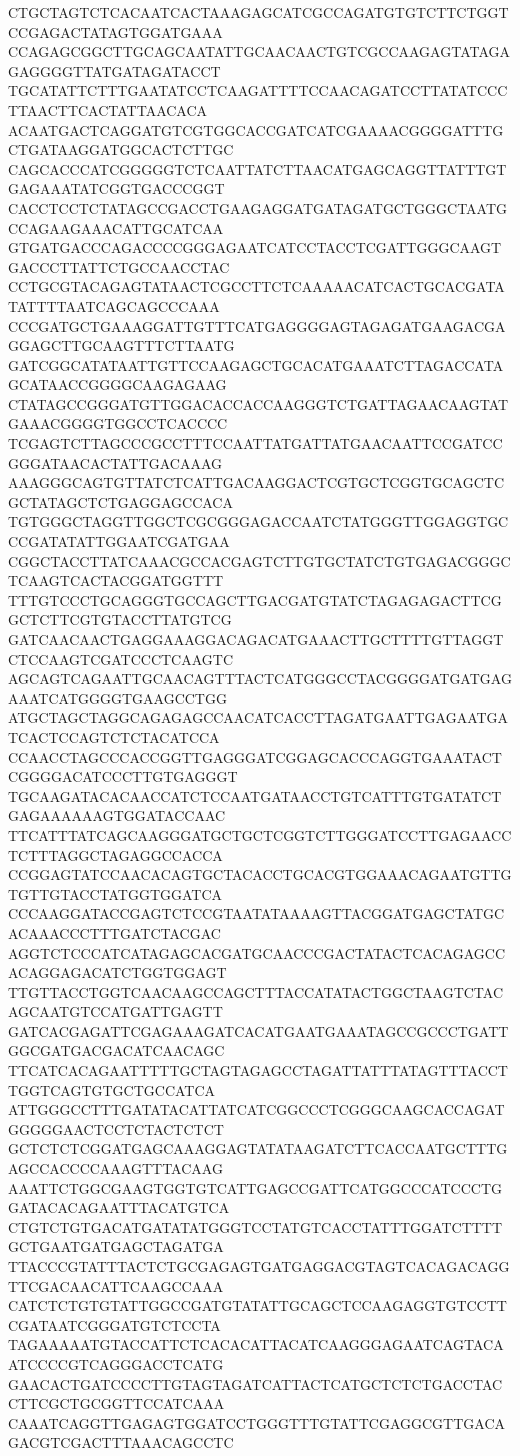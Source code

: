 CTGCTAGTCTCACAATCACTAAAGAGCATCGCCAGATGTGTCTTCTGGTCCGAGACTATAGTGGATGAAA
CCAGAGCGGCTTGCAGCAATATTGCAACAACTGTCGCCAAGAGTATAGAGAGGGGTTATGATAGATACCT
TGCATATTCTTTGAATATCCTCAAGATTTTCCAACAGATCCTTATATCCCTTAACTTCACTATTAACACA
ACAATGACTCAGGATGTCGTGGCACCGATCATCGAAAACGGGGATTTGCTGATAAGGATGGCACTCTTGC
CAGCACCCATCGGGGGTCTCAATTATCTTAACATGAGCAGGTTATTTGTGAGAAATATCGGTGACCCGGT
CACCTCCTCTATAGCCGACCTGAAGAGGATGATAGATGCTGGGCTAATGCCAGAAGAAACATTGCATCAA
GTGATGACCCAGACCCCGGGAGAATCATCCTACCTCGATTGGGCAAGTGACCCTTATTCTGCCAACCTAC
CCTGCGTACAGAGTATAACTCGCCTTCTCAAAAACATCACTGCACGATATATTTTAATCAGCAGCCCAAA
CCCGATGCTGAAAGGATTGTTTCATGAGGGGAGTAGAGATGAAGACGAGGAGCTTGCAAGTTTCTTAATG
GATCGGCATATAATTGTTCCAAGAGCTGCACATGAAATCTTAGACCATAGCATAACCGGGGCAAGAGAAG
CTATAGCCGGGATGTTGGACACCACCAAGGGTCTGATTAGAACAAGTATGAAACGGGGTGGCCTCACCCC
TCGAGTCTTAGCCCGCCTTTCCAATTATGATTATGAACAATTCCGATCCGGGATAACACTATTGACAAAG
AAAGGGCAGTGTTATCTCATTGACAAGGACTCGTGCTCGGTGCAGCTCGCTATAGCTCTGAGGAGCCACA
TGTGGGCTAGGTTGGCTCGCGGGAGACCAATCTATGGGTTGGAGGTGCCCGATATATTGGAATCGATGAA
CGGCTACCTTATCAAACGCCACGAGTCTTGTGCTATCTGTGAGACGGGCTCAAGTCACTACGGATGGTTT
TTTGTCCCTGCAGGGTGCCAGCTTGACGATGTATCTAGAGAGACTTCGGCTCTTCGTGTACCTTATGTCG
GATCAACAACTGAGGAAAGGACAGACATGAAACTTGCTTTTGTTAGGTCTCCAAGTCGATCCCTCAAGTC
AGCAGTCAGAATTGCAACAGTTTACTCATGGGCCTACGGGGATGATGAGAAATCATGGGGTGAAGCCTGG
ATGCTAGCTAGGCAGAGAGCCAACATCACCTTAGATGAATTGAGAATGATCACTCCAGTCTCTACATCCA
CCAACCTAGCCCACCGGTTGAGGGATCGGAGCACCCAGGTGAAATACTCGGGGACATCCCTTGTGAGGGT
TGCAAGATACACAACCATCTCCAATGATAACCTGTCATTTGTGATATCTGAGAAAAAAGTGGATACCAAC
TTCATTTATCAGCAAGGGATGCTGCTCGGTCTTGGGATCCTTGAGAACCTCTTTAGGCTAGAGGCCACCA
CCGGAGTATCCAACACAGTGCTACACCTGCACGTGGAAACAGAATGTTGTGTTGTACCTATGGTGGATCA
CCCAAGGATACCGAGTCTCCGTAATATAAAAGTTACGGATGAGCTATGCACAAACCCTTTGATCTACGAC
AGGTCTCCCATCATAGAGCACGATGCAACCCGACTATACTCACAGAGCCACAGGAGACATCTGGTGGAGT
TTGTTACCTGGTCAACAAGCCAGCTTTACCATATACTGGCTAAGTCTACAGCAATGTCCATGATTGAGTT
GATCACGAGATTCGAGAAAGATCACATGAATGAAATAGCCGCCCTGATTGGCGATGACGACATCAACAGC
TTCATCACAGAATTTTTGCTAGTAGAGCCTAGATTATTTATAGTTTACCTTGGTCAGTGTGCTGCCATCA
ATTGGGCCTTTGATATACATTATCATCGGCCCTCGGGCAAGCACCAGATGGGGGAACTCCTCTACTCTCT
GCTCTCTCGGATGAGCAAAGGAGTATATAAGATCTTCACCAATGCTTTGAGCCACCCCAAAGTTTACAAG
AAATTCTGGCGAAGTGGTGTCATTGAGCCGATTCATGGCCCATCCCTGGATACACAGAATTTACATGTCA
CTGTCTGTGACATGATATATGGGTCCTATGTCACCTATTTGGATCTTTTGCTGAATGATGAGCTAGATGA
TTACCCGTATTTACTCTGCGAGAGTGATGAGGACGTAGTCACAGACAGGTTCGACAACATTCAAGCCAAA
CATCTCTGTGTATTGGCCGATGTATATTGCAGCTCCAAGAGGTGTCCTTCGATAATCGGGATGTCTCCTA
TAGAAAAATGTACCATTCTCACACATTACATCAAGGGAGAATCAGTACAATCCCCGTCAGGGACCTCATG
GAACACTGATCCCCTTGTAGTAGATCATTACTCATGCTCTCTGACCTACCTTCGCTGCGGTTCCATCAAA
CAAATCAGGTTGAGAGTGGATCCTGGGTTTGTATTCGAGGCGTTGACAGACGTCGACTTTAAACAGCCTC
